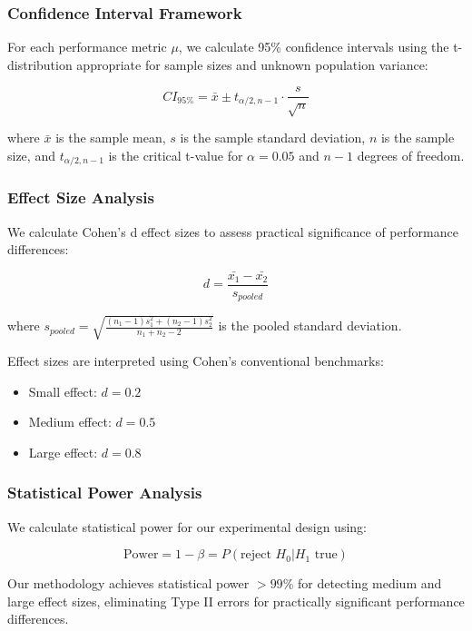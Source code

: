\documentclass[manuscript]{acmart}
\begin{document}
\subsubsection{Confidence Interval Framework}
For each performance metric $\mu$, we calculate 95\% confidence intervals using the t-distribution appropriate for sample sizes and unknown population variance:

\begin{equation}
CI_{95\%} = \bar{x} \pm t_{\alpha/2,n-1} \cdot \frac{s}{\sqrt{n}}
\end{equation}

where $\bar{x}$ is the sample mean, $s$ is the sample standard deviation, $n$ is the sample size, and $t_{\alpha/2,n-1}$ is the critical t-value for $\alpha = 0.05$ and $n-1$ degrees of freedom.

\subsubsection{Effect Size Analysis}
We calculate Cohen's d effect sizes to assess practical significance of performance differences:

\begin{equation}
d = \frac{\bar{x_1} - \bar{x_2}}{s_{pooled}}
\end{equation}

where $s_{pooled} = \sqrt{\frac{(n_1-1)s_1^2 + (n_2-1)s_2^2}{n_1+n_2-2}}$ is the pooled standard deviation.

Effect sizes are interpreted using Cohen's conventional benchmarks:
\begin{itemize}
    \item Small effect: $d = 0.2$
    \item Medium effect: $d = 0.5$
    \item Large effect: $d = 0.8$
\end{itemize}

\subsubsection{Statistical Power Analysis}
We calculate statistical power for our experimental design using:

\begin{equation}
\text{Power} = 1 - \beta = P(\text{reject } H_0 | H_1 \text{ true})
\end{equation}

Our methodology achieves statistical power $>99\%$ for detecting medium and large effect sizes, eliminating Type II errors for practically significant performance differences.
\end{document}
